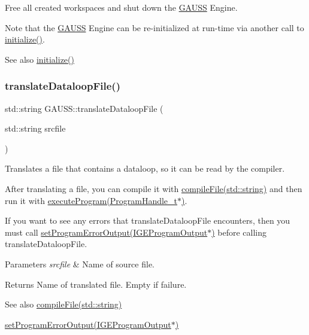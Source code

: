 Free all created workspaces and shut down the \hyperlink{class_g_a_u_s_s}{G\+A\+U\+SS} Engine. 

Note that the \hyperlink{class_g_a_u_s_s}{G\+A\+U\+SS} Engine can be re-\/initialized at run-\/time via another call to \hyperlink{class_g_a_u_s_s_aad9f7a3a527b9c5961d1cc1b1aa9066c}{initialize()}.

\begin{DoxySeeAlso}{See also}
\hyperlink{class_g_a_u_s_s_aad9f7a3a527b9c5961d1cc1b1aa9066c}{initialize()} 
\end{DoxySeeAlso}
\mbox{\label{class_g_a_u_s_s_aba7db184b734820e056d37d6880a65a7}} 
\subsubsection{\texorpdfstring{translate\+Dataloop\+File()}{translateDataloopFile()}}
{\footnotesize\ttfamily std\+::string G\+A\+U\+S\+S\+::translate\+Dataloop\+File (\begin{DoxyParamCaption}\item[{std\+::string}]{srcfile }\end{DoxyParamCaption})}



Translates a file that contains a dataloop, so it can be read by the compiler. 

After translating a file, you can compile it with \hyperlink{class_g_a_u_s_s_a981bdafede1af555a73b9abe05333341}{compile\+File(std\+::string)} and then run it with \hyperlink{class_g_a_u_s_s_a7fc9de69421c14aadb9a6310fecabcca}{execute\+Program(\+Program\+Handle\+\_\+t$\ast$)}.

If you want to see any errors that translate\+Dataloop\+File encounters, then you must call \hyperlink{class_g_a_u_s_s_abd75266b2c4075da75163fe95b013ef3}{set\+Program\+Error\+Output(\+I\+G\+E\+Program\+Output$\ast$)} before calling translate\+Dataloop\+File.


\begin{DoxyParams}{Parameters}
{\em srcfile} & Name of source file. \\
\hline
\end{DoxyParams}
\begin{DoxyReturn}{Returns}
Name of translated file. Empty if failure.
\end{DoxyReturn}
\begin{DoxySeeAlso}{See also}
\hyperlink{class_g_a_u_s_s_a981bdafede1af555a73b9abe05333341}{compile\+File(std\+::string)} 

\hyperlink{class_g_a_u_s_s_abd75266b2c4075da75163fe95b013ef3}{set\+Program\+Error\+Output(\+I\+G\+E\+Program\+Output$\ast$)} 
\end{DoxySeeAlso}
\mbox{\label{class_g_a_u_s_s_a3c849e0f4162634039390e59ed61054e}} 

